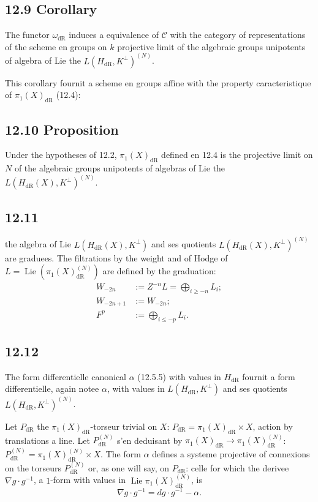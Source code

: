 \documentclass[12pt,a4paper]{article}
\theoremstyle{plain}
\theoremstyle{definition}
\theoremstyle{remark}
\DeclareMathOperator{\Lie}{Lie}
\newcommand{\cC}{\mathcal{C}}
\newcommand{\dr}{\mathrm{dR}}
\begin{document}
\subsection*{12.9 Corollary}

The functor $\omega_{\dr}$ induces a equivalence of $\cC$ with the category of representations of the scheme en groups on $k$ projective limit of the algebraic groups unipotents of algebra of Lie the $L(H_{\dr}, K^\perp)^{(N)}$.

This corollary fournit a scheme en groups affine with the property caracteristique of $\pi_1(X)_{\dr}$ (12.4):

\subsection*{12.10 Proposition}

Under the hypotheses of 12.2, $\pi_1(X)_{\dr}$ defined en 12.4 is the projective limit on $N$ of the algebraic groups unipotents of algebras of Lie the $L(H_{\dr}(X), K^\perp)^{(N)}$.

\subsection*{12.11}

the algebra of Lie $L(H_{\dr}(X), K^\perp)$ and ses quotients $L(H_{\dr}(X), K^\perp)^{(N)}$ are graduees. The filtrations by the weight and of Hodge of $L = \Lie(\pi_1(X)_{\dr}^{(N)})$ are defined by the graduation:
\begin{align*}
W_{-2n} &:= Z^{-n} L = \textstyle\bigoplus_{i \geqslant -n} L_i;\\
W_{-2n+1} &:= W_{-2n};\\
F^p &:= \textstyle\bigoplus_{i \leqslant -p} L_i.
\end{align*}

\subsection*{12.12}

The form differentielle canonical $\alpha$ (12.5.5) with values in $H_{\dr}$ fournit a form differentielle, again notee $\alpha$, with values in $L(H_{\dr}, K^\perp)$ and ses quotients $L(H_{\dr}, K^\perp)^{(N)}$.

Let $P_{\dr}$ the $\pi_1(X)_{\dr}$-torseur trivial on $X$: $P_{\dr} = \pi_1(X)_{\dr} \times X$, action by translations a line. Let $P_{\dr}^{(N)}$ s'en deduisant by $\pi_1(X)_{\dr} \to \pi_1(X)_{\dr}^{(N)}$: $P_{\dr}^{(N)} = \pi_1(X)_{\dr}^{(N)} \times X$. The form $\alpha$ defines a systeme projective of connexions on the torseurs $P_{\dr}^{(N)}$ or, as one will say, on $P_{\dr}$: celle for which the derivee $\nabla g \cdot g^{-1}$, a $1$-form with values in $\Lie \pi_1(X)_{\dr}^{(N)}$, is
\begin{equation}\label{eq:12.12.1}
\nabla g \cdot g^{-1} = dg \cdot g^{-1} - \alpha.
\end{equation}
\end{document}
